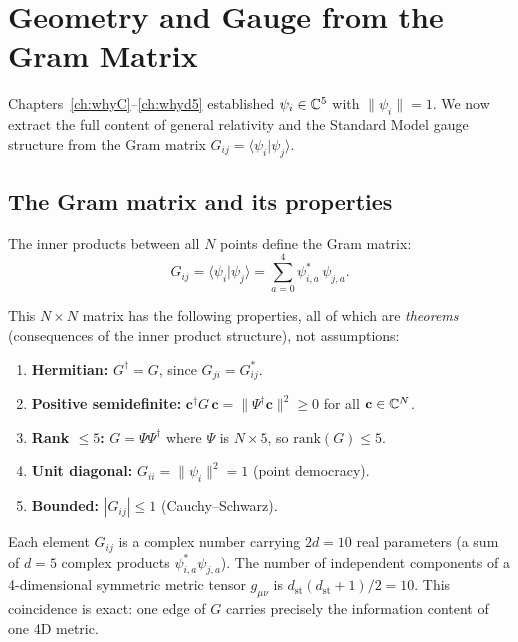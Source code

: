 \section{Geometry and Gauge from the Gram Matrix}
\label{ch:geometry}

Chapters~\ref{ch:whyC}--\ref{ch:whyd5} established $\psi_i \in \mathbb{C}^5$ with $\|\psi_i\| = 1$. We now extract the full content of general relativity and the Standard Model gauge structure from the Gram matrix $G_{ij} = \langle\psi_i|\psi_j\rangle$.

\subsection{The Gram matrix and its properties}

The inner products between all $N$ points define the Gram matrix:
\begin{equation}
G_{ij} = \langle\psi_i|\psi_j\rangle = \sum_{a=0}^{4} \psi^*_{i,a}\,\psi_{j,a}.
\end{equation}

This $N \times N$ matrix has the following properties, all of which are \emph{theorems} (consequences of the inner product structure), not assumptions:

\begin{enumerate}[label=(\alph*)]
\item \textbf{Hermitian:} $G^\dagger = G$, since $G_{ji} = G^*_{ij}$.
\item \textbf{Positive semidefinite:} $\mathbf{c}^\dagger G\,\mathbf{c} = \|\Psi^\dagger\mathbf{c}\|^2 \geq 0$ for all $\mathbf{c} \in \mathbb{C}^N$.
\item \textbf{Rank $\leq 5$:} $G = \Psi\Psi^\dagger$ where $\Psi$ is $N \times 5$, so $\text{rank}(G) \leq 5$.
\item \textbf{Unit diagonal:} $G_{ii} = \|\psi_i\|^2 = 1$ (point democracy).
\item \textbf{Bounded:} $|G_{ij}| \leq 1$ (Cauchy--Schwarz).
\end{enumerate}

Each element $G_{ij}$ is a complex number carrying $2d = 10$ real parameters (a sum of $d = 5$ complex products $\psi^*_{i,a}\psi_{j,a}$). The number of independent components of a 4-dimensional symmetric metric tensor $g_{\mu\nu}$ is $d_\text{st}(d_\text{st}+1)/2 = 10$. This coincidence is exact: one edge of $G$ carries precisely the information content of one 4D metric.

